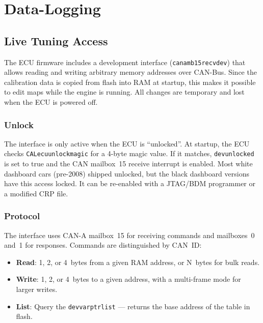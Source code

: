 \documentclass[a4paper,11pt]{article}
\renewcommand{\_}{\oldunderscore\allowbreak}
\begin{document}
\section{Data-Logging}\label{sec:data-logging}

\subsection{Live Tuning Access}\label{sec:live-tuning}

The ECU firmware includes a development interface
(\texttt{can\_a\_mb15\_recv\_dev}) that allows reading and writing arbitrary
memory addresses over CAN-Bus. Since the calibration data is copied from flash
into RAM at startup, this makes it possible to edit maps while the engine is
running. All changes are temporary and lost when the ECU is powered off.

\subsubsection*{Unlock}

The interface is only active when the ECU is ``unlocked''. At startup, the ECU
checks \texttt{CAL\_ecu\_unlock\_magic} for a 4-byte magic value. If it
matches, \texttt{dev\_unlocked} is set to true and the CAN mailbox~15 receive
interrupt is enabled. Most white dashboard cars (pre-2008) shipped unlocked,
but the black dashboard versions have this access locked. It can be re-enabled
with a JTAG/BDM programmer or a modified CRP file.

\subsubsection*{Protocol}

The interface uses CAN-A mailbox~15 for receiving commands and mailboxes~0
and~1 for responses. Commands are distinguished by CAN~ID:

\begin{itemize}
\item \textbf{Read}: 1, 2, or 4~bytes from a given RAM address, or N~bytes
      for bulk reads.
\item \textbf{Write}: 1, 2, or 4~bytes to a given address, with a multi-frame
      mode for larger writes.
\item \textbf{List}: Query the \texttt{dev\_varptr\_list} --- returns the base
      address of the table in flash.
\end{itemize}
\end{document}
